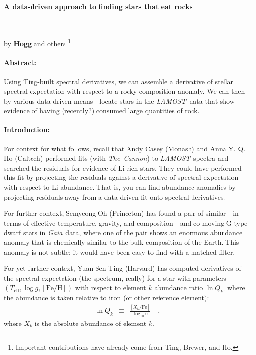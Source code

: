 \documentclass[12pt]{article}
\newcommand{\project}[1]{\textsl{#1}}
\newcommand{\acronym}[1]{{\small{#1}}}
\newcommand{\LAMOST}{\project{\acronym{LAMOST}}}
\newcommand{\TheCannon}{\project{The~Cannon}}
\newcommand{\Gaia}{\project{Gaia}}
\newcommand{\e}{\mathrm{e}}
\newcommand{\teff}{T_{\mathrm{eff}}}
\newcommand{\logg}{\log g}
\newcommand{\feh}{[\mathrm{Fe}/\mathrm{H}]}
\begin{document}
\raggedbottom\sloppy\sloppypar\frenchspacing

\paragraph{A data-driven approach to finding stars that eat rocks}
~

\noindent
by \textbf{Hogg} and others%
\footnote{Important contributions have already come from Ting, Brewer, and Ho.}

\paragraph{Abstract:}
Using Ting-built spectral derivatives,
we can assemble a derivative of stellar spectral expectation with respect
to a rocky composition anomaly.
We can then---by various data-driven means---locate stars in the
\LAMOST\ data that show evidence of having (recently?) consumed
large quantities of rock.

\paragraph{Introduction:}
For context for what follows, recall that Andy Casey (Monash) and Anna
Y. Q. Ho (Caltech) performed fits (with \TheCannon) to
\LAMOST\ spectra and searched the residuals for evidence of
Li-rich stars.
They could have performed this fit by projecting the
residuals against a derivative of spectral expectation with respect
to Li abundance.
That is, you can find abundance anomalies by projecting residuals away
from a data-driven fit onto spectral derivatives.

For further context, Semyeong Oh (Princeton) has found a pair of similar---in
terms of effective temperature, gravity, and composition---and
co-moving G-type dwarf stars in \Gaia\ data, where one of the pair
shows an enormous abundance anomaly that is chemically similar to the
bulk composition of the Earth.
This anomaly is not subtle; it would have been easy to find with a matched
filter.

For yet further context, Yuan-Sen Ting (Harvard) has computed derivatives
of the spectral expectation (the spectrum, really) for a star with parameters
$(\teff, \logg, \feh)$ with respect to element $k$ abundance ratio $\ln Q_k$,
where the abundance is taken relative to iron (or other reference element):
\begin{eqnarray}
\ln Q_k &\equiv& \frac{[X_k / \mathrm{Fe}]}{\log_{10} \e}
\quad ,
\end{eqnarray}
where $X_k$ is the absolute abundance of element $k$.
\end{document}
